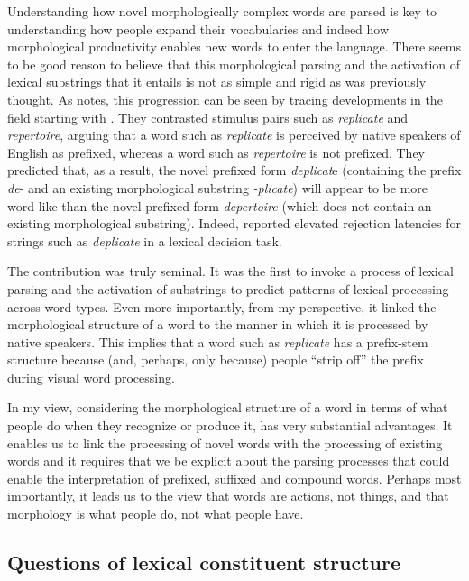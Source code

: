 \documentclass[output=paper]{langsci/langscibook}
\begin{document}
Understanding how novel morphologically complex words are parsed is key to understanding how people expand their vocabularies and indeed how morphological productivity enables new words to enter the language.  There seems to be good reason to believe that this morphological parsing and the activation of lexical substrings that it entails is not as simple and rigid as was previously thought.  As \citet{Libben2015} notes, this progression can be seen by tracing developments in the field starting with \citet{TaftForster1975}. They contrasted stimulus pairs such as \textit{replicate} and \textit{repertoire}, arguing that a word such as \textit{replicate} is perceived by native speakers of English as prefixed, whereas a word such as \textit{repertoire} is not prefixed. They predicted that, as a result, the novel prefixed form \textit{deplicat}e (containing the prefix \textit{de}{}- and an existing morphological substring \textit{-plicate}) will appear to be more word-like than the novel prefixed form \textit{depertoire} (which does not contain an existing morphological substring). Indeed, \citet{TaftForster1975} reported elevated rejection latencies for strings such as \textit{deplicate} in a lexical decision task.

The \citet{TaftForster1975} contribution was truly seminal. It was the first to invoke a process of lexical parsing and the activation of substrings to predict patterns of lexical processing across word types.  Even more importantly, from my perspective, it linked the morphological structure of a word to the manner in which it is processed by native speakers. This implies that a word such as \textit{replicate} has a prefix-stem structure because (and, perhaps, only because) people ``strip off'' the prefix during visual word processing.\largerpage

In my view, considering the morphological structure of a word in terms of what people do when they recognize or produce it, has very substantial advantages. It enables us to link the processing of novel words with the processing of existing words and it requires that we be explicit about the parsing processes that could enable the interpretation of prefixed, suffixed and compound words. Perhaps most importantly, it leads us to the view that words are actions, not things, and that morphology is what people do, not what people have. 

\subsection{Questions of lexical constituent structure}\label{sec:libben:1.2}
\end{document}
